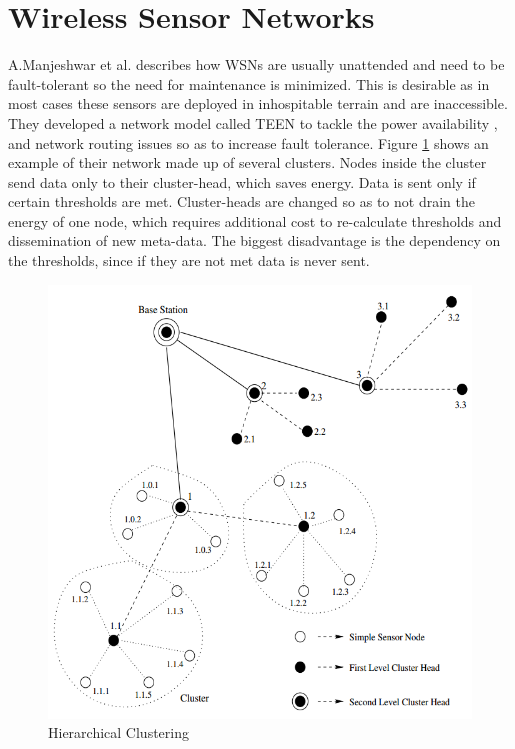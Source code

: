 \documentclass{mproj}
\begin{document}
\section{Wireless Sensor Networks}
A.Manjeshwar et al. \cite{teen} describes how WSNs are usually unattended and need to be fault-tolerant so the need for maintenance is minimized. This is desirable as in most cases these sensors are deployed in inhospitable terrain and are inaccessible. They developed a network model called TEEN to tackle the power availability , and network routing issues so as to increase fault tolerance. Figure \ref{fig:teen} shows an example of their network made up of several clusters. Nodes inside the cluster send data only to their cluster-head, which saves energy. Data is sent only if certain thresholds are met. Cluster-heads are changed so as to not drain the energy of one node, which requires additional cost to re-calculate thresholds and dissemination of new meta-data. The biggest disadvantage is the dependency on the thresholds, since if they are not met data is never sent.

\begin{figure}[H]
\caption{Hierarchical Clustering \cite{teen}}
\label{fig:teen}
\centerline{\includegraphics[scale=0.5]{teen}}
\end{figure}
\end{document}

